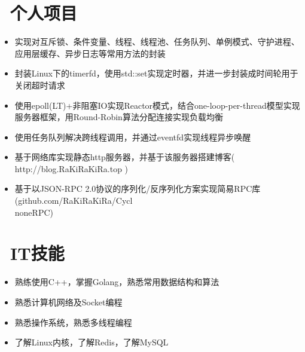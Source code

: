 \documentclass{resume}
\begin{document}
\section{\faCogs\ 个人项目}
\begin{onehalfspacing}
\begin{itemize}
  \item 实现对互斥锁、条件变量、线程、线程池、任务队列、单例模式、守护进程、应用层缓存、异步日志等常用方法的封装
  \item 封装Linux下的timerfd，使用std::set实现定时器，并进一步封装成时间轮用于关闭超时请求
  \item 使用epoll(LT)+非阻塞IO实现Reactor模式，结合one-loop-per-thread模型实现服务器框架，用Round-Robin算法分配连接实现负载均衡
  \item 使用任务队列解决跨线程调用，并通过eventfd实现线程异步唤醒
  \item 基于网络库实现静态http服务器，并基于该服务器搭建博客( http://blog.RaKiRaKiRa.top )
  \item 基于以JSON-RPC 2.0协议的序列化/反序列化方案实现简易RPC库(github.com/RaKiRaKiRa/Cycl\\noneRPC)
\end{itemize}
\end{onehalfspacing}

\section{\faInfo\ IT技能}
\begin{itemize}[parsep=0.5ex]
  \item 熟练使用C++，掌握Golang，熟悉常用数据结构和算法
  \item 熟悉计算机网络及Socket编程
  \item 熟悉操作系统，熟悉多线程编程
  \item 了解Linux内核，了解Redis，了解MySQL
\end{itemize}





%
%
\end{document}
